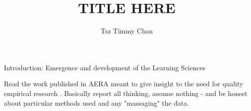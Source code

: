 \documentclass{TC}
\title{TITLE HERE}	%
\author{Tsz Timmy Chan}	%
\begin{document}
Introduction: Emergence and development of the Learning Sciences

Read the work published in \gls{AERA} meant to give insight to the need for quality empirical research \parencite{noauthor_standards_2006}. 
Basically report all thinking, assume nothing - and be honest about particular methods used and any "massaging" the data.
\end{document}
